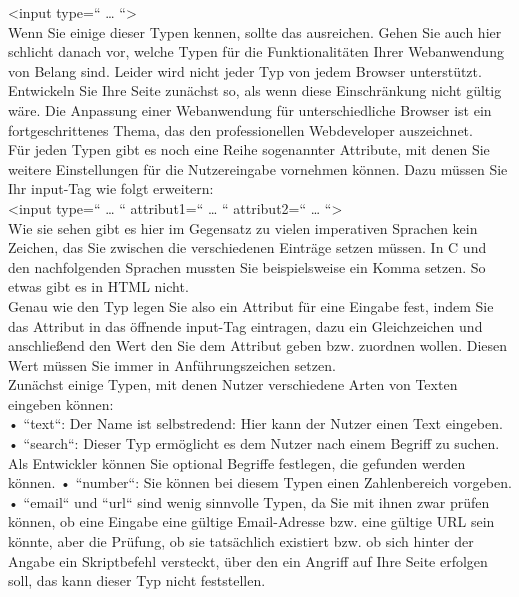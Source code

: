 <input type=“ … “>\\

Wenn Sie einige dieser Typen kennen, sollte das ausreichen. Gehen Sie auch hier schlicht danach vor, welche Typen für die Funktionalitäten Ihrer Webanwendung von Belang sind. Leider wird nicht jeder Typ von jedem Browser unterstützt. Entwickeln Sie Ihre Seite zunächst so, als wenn diese Einschränkung nicht gültig wäre. Die Anpassung einer Webanwendung für unterschiedliche Browser ist ein fortgeschrittenes Thema, das den professionellen Webdeveloper auszeichnet.\\

Für jeden Typen gibt es noch eine Reihe sogenannter Attribute, mit denen Sie weitere Einstellungen für die Nutzereingabe vornehmen können. Dazu müssen Sie Ihr input-Tag wie folgt erweitern:\\

<input type=`` … `` attribut1=`` … `` attribut2=`` … ``>\\

Wie sie sehen gibt es hier im Gegensatz zu vielen imperativen Sprachen kein Zeichen, das Sie zwischen die verschiedenen Einträge setzen müssen. In C und den nachfolgenden Sprachen mussten Sie beispielsweise ein Komma setzen. So etwas gibt es in HTML nicht.\\

Genau wie den Typ legen Sie also ein Attribut für eine Eingabe fest, indem Sie das Attribut in das öffnende input-Tag eintragen, dazu ein Gleichzeichen und anschließend den Wert den Sie dem Attribut geben bzw. zuordnen wollen. Diesen Wert müssen Sie immer in Anführungszeichen setzen.\\

Zunächst einige Typen, mit denen Nutzer verschiedene Arten von Texten eingeben können:\\

•	``text``: Der Name ist selbstredend: Hier kann der Nutzer einen Text eingeben.
•	``search``: Dieser Typ ermöglicht es dem Nutzer nach einem Begriff zu suchen. Als Entwickler können Sie optional Begriffe festlegen, die gefunden werden können.
•	``number``: Sie können bei diesem Typen einen Zahlenbereich vorgeben.
•	``email`` und ``url`` sind wenig sinnvolle Typen, da Sie mit ihnen zwar prüfen können, ob eine Eingabe eine gültige Email-Adresse bzw. eine gültige URL sein könnte, aber die Prüfung, ob sie tatsächlich existiert bzw. ob sich hinter der Angabe ein Skriptbefehl versteckt, über den ein Angriff auf Ihre Seite erfolgen soll, das kann dieser Typ nicht feststellen.\\

